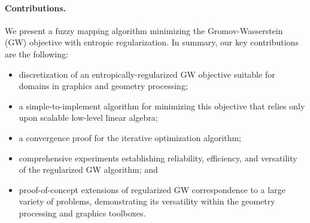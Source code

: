 \paragraph*{Contributions.} We present a fuzzy mapping algorithm minimizing the Gromov-Wasserstein (GW) objective with entropic regularization. In summary, our key contributions are the following: %
\begin{itemize}[topsep=0pt,itemsep=-1ex,partopsep=1ex,parsep=1ex]
\item discretization of an entropically-regularized GW objective suitable for domains in graphics and geometry processing;
\item a simple-to-implement algorithm for minimizing this objective that relies only upon scalable low-level linear algebra;
\item a convergence proof for the iterative optimization algorithm;
\item comprehensive experiments establishing reliability, efficiency, and versatility of the regularized GW algorithm; and
\item proof-of-concept extensions of regularized GW correspondence to a large variety of problems, demonstrating its versatility within the geometry processing and graphics toolboxes.%
\end{itemize}







